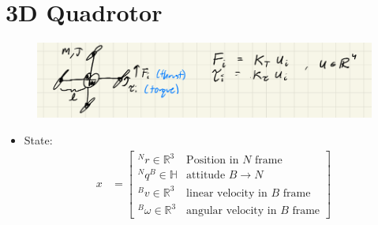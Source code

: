 \documentclass[11pt]{article}
\begin{document}
\section{3D Quadrotor}
\begin{figure}[H]
    \centering
    \includegraphics[width=\linewidth]{lecture_16_1.png}
\end{figure}


\begin{itemize}
    \item State:
    \begin{align*}
        x &=
        \begin{bmatrix}
            ^Nr \in \mathbb{R}^3 & \text{Position in } N \text{ frame} \\
            ^Nq^B \in \mathbb{H} & \text{attitude } B\rightarrow N \\
            ^Bv \in\mathbb{R}^3  &\text{linear velocity in } B \text{ frame} \\
            ^B\omega \in\mathbb{R}^3 & \text{angular velocity in } B \text{ frame}
        \end{bmatrix}
    \end{align*}


\end{itemize}
\end{document}
